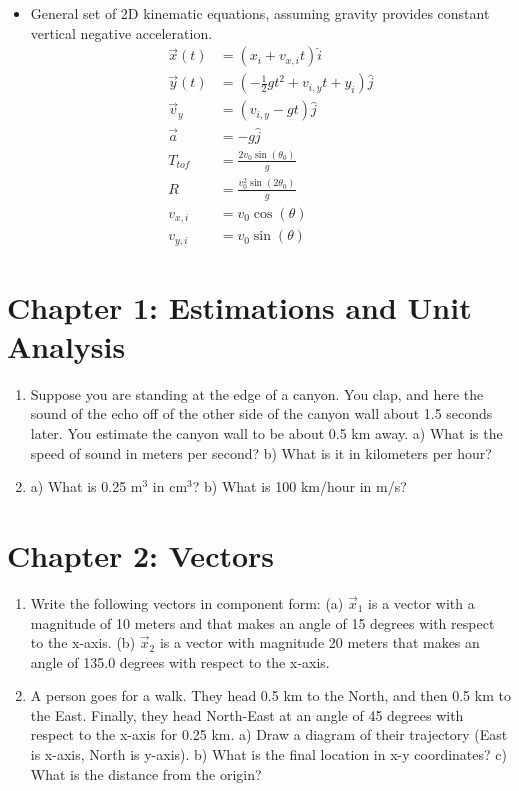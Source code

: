\documentclass[10pt]{article}
\begin{document}
\begin{itemize}
\item General set of 2D kinematic equations, assuming gravity provides constant vertical negative acceleration.
\begin{align}
\vec{x}(t) &= (x_i + v_{x,i} t) \hat{i} \\
\vec{y}(t) &= (-\frac{1}{2}g t^2 + v_{i,y} t + y_i) \hat{j} \\
\vec{v}_y &= (v_{i,y} - g t) \hat{j} \\
\vec{a} &= -g \hat{j} \\
T_{tof} &= \frac{2 v_0\sin(\theta_0)}{g} \\
R &= \frac{v_0^2\sin(2\theta_0)}{g} \\
v_{x,i} &= v_0 \cos(\theta) \\
v_{y,i} &= v_0 \sin(\theta)
\end{align}
\end{itemize}

\clearpage

\section{Chapter 1: Estimations and Unit Analysis}

\begin{enumerate}
\item Suppose you are standing at the edge of a canyon.  You clap, and here the sound of the echo off of the other side of the canyon wall about 1.5 seconds later.  You estimate the canyon wall to be about 0.5 km away.  a) What is the speed of sound in meters per second?  b) What is it in kilometers per hour? \\ \vspace{1.5cm}
\item a) What is 0.25 m$^3$ in cm$^3$? b) What is 100 km/hour in m/s? \\ \vspace{1cm}
\end{enumerate}

\section{Chapter 2: Vectors}

\begin{enumerate}
\item Write the following vectors in component form: (a) $\vec{x}_1$ is a vector with a magnitude of 10 meters and that makes an angle of 15 degrees with respect to the x-axis. (b) $\vec{x}_2$ is a vector with magnitude 20 meters that makes an angle of 135.0 degrees with respect to the x-axis.  \\ \vspace{2.0cm}
\item A person goes for a walk.  They head 0.5 km to the North, and then 0.5 km to the East.  Finally, they head North-East at an angle of 45 degrees with respect to the x-axis for 0.25 km.  a) Draw a diagram of their trajectory (East is x-axis, North is y-axis). b) What is the final location in x-y coordinates? c) What is the distance from the origin? \\ \vspace{3cm}
\end{enumerate}
\end{document}
